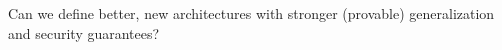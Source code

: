 Can we define better, new architectures with stronger (provable) generalization and security guarantees?
%
%
%
%
%
%
%
%
%
%
%
%

